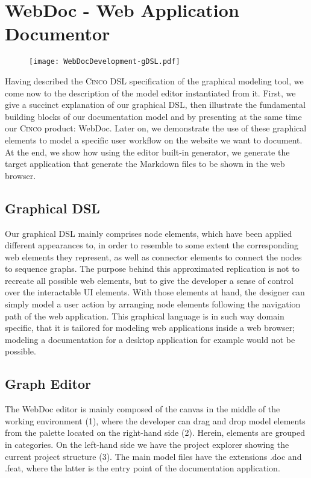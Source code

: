 \chapter{WebDoc - Web Application Documentor}\label{ch:CP}

\begin{figure}[h]
    \centering
    \texttt{[image: WebDocDevelopment-gDSL.pdf]}
    \label{fig:webDoc}
\end{figure}

Having described the \textsc{Cinco} DSL specification of the graphical modeling tool, we come now to the description of the model editor instantiated from it. First, we give a succinct explanation of our graphical DSL, then illustrate the fundamental building blocks of our documentation model and by presenting at the same time our \textsc{Cinco} product: WebDoc. Later on, we demonstrate the use of these graphical elements to model a specific user workflow on the website we want to document. At the end, we show how using the editor built-in generator, we generate the target application that generate the Markdown files to be shown in the web browser.

\section{Graphical DSL}\label{sec:gDSL}

Our graphical DSL mainly comprises node elements, which have been applied different appearances to, in order to resemble to some extent the corresponding web elements they represent, as well as connector elements to connect the nodes to sequence graphs. The purpose behind this approximated replication is not to recreate all possible web elements, but to give the developer a sense of control over the interactable UI elements. With those elements at hand, the designer can simply model a user action by arranging node elements following the navigation path of the web application. This graphical language is in such way domain specific, that it is tailored for modeling web applications inside a web browser; modeling a documentation for a desktop application for example would not be possible.

\section{Graph Editor}\label{sec:graphEditor}

The WebDoc editor is mainly composed of the canvas in the middle of the working environment (1), where the developer can drag and drop model elements from the palette located on the right-hand side (2). Herein, elements are grouped in categories. On the left-hand side we have the project explorer showing the current project structure (3). The main model files have the extensions .doc and .feat, where the latter is the entry point of the documentation application.

